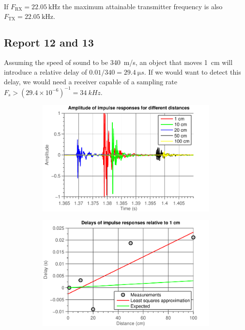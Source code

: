 \documentclass[11pt,titlepage]{report}
\begin{document}
If $F_{\text{RX}}=\SI{22.05}{\kilo\hertz}$ the maximum attainable transmitter frequency is also $F_{\text{TX}}=\SI{22.05}{\kilo\hertz}$.

\subsection{Report 12 and 13}
\label{subsec:ass1-rep-12-13}
Assuming the speed of sound to be \SI{340}{m/s}, an object that moves \SI{1}{cm} will introduce a relative delay of $0.01/340 = \SI{29.4}{\micro s}$. If we would want to detect this delay, we would need a receiver capable of a sampling rate $F_s > (29.4 \times 10^{-6})^{-1} = \SI{34}{kHz}$.

\begin{figure}[H]
	\centering
	\begin{subfigure}{0.49\textwidth}
		\includegraphics[width=\textwidth]{../../deliverable-7-resources/figures/ass-1/report-11-12-13/ass-1-report-13-time.pdf}
	\end{subfigure}
	\begin{subfigure}{0.49\textwidth}
		\includegraphics[width=\textwidth]{../../deliverable-7-resources/figures/ass-1/report-11-12-13/ass-1-report-13-delays.pdf}

\end{subfigure}
\end{figure}
\end{document}
